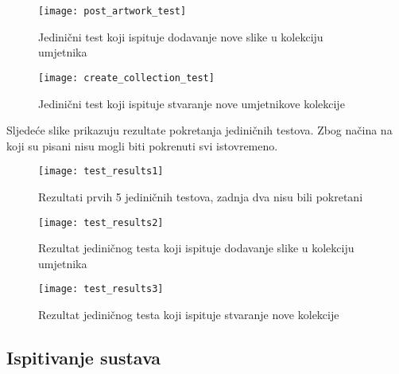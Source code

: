 {				\begin{figure}[H]
					
					\texttt{[image: post\_artwork\_test]}
					\caption{Jedinični test koji ispituje dodavanje nove slike u kolekciju umjetnika}
					
				\end{figure}
			
				\begin{figure}[H]
					
					\texttt{[image: create\_collection\_test]}
					\caption{Jedinični test koji ispituje stvaranje nove umjetnikove kolekcije}
					
				\end{figure}
			
			{Sljedeće slike prikazuju rezultate pokretanja jediničnih testova. Zbog načina na koji su pisani nisu mogli biti pokrenuti svi istovremeno.}
				\begin{figure}[H]
					
					\texttt{[image: test\_results1]}
					\caption{Rezultati prvih 5 jediničnih testova, zadnja dva nisu bili pokretani}
					
				\end{figure}
			
				\begin{figure}[H]
					
					\texttt{[image: test\_results2]}
					\caption{Rezultat jediničnog testa koji ispituje dodavanje slike u kolekciju umjetnika}
					
				\end{figure}
				
				\begin{figure}[H]
					
					\texttt{[image: test\_results3]}
					\caption{Rezultat jediničnog testa koji ispituje stvaranje nove kolekcije}
					
				\end{figure}
			
			
			
			
			\subsection{Ispitivanje sustava}
			
}
